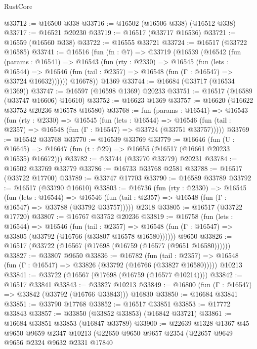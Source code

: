 \begin{lexlean}{RustCore}
\begin{coremodule}
@33712 := @16500 @338
@33716 := @16502 (@16506 @338) (@16512 @338)
@33717 := @16521 @20230
@33719 := @16517 (@33717 @16536)
@33721 := @16559 (@16560 @338)
@33722 := @16555 @33721
@33724 := @16517 (@33722 @16585)
@33741 := @16516
    (fun (fn : @7) =>
    @33719
      (@16539
        (@16542
          (fun (params : @16541) =>
          @16543
            (fun (rty : @2330) =>
            @16545
              (fun (lets : @16544) =>
              @16546 (fun (tail : @2357) => @16548 (fun (Γ : @16547) => @33724 @16632))))))
        @16678))
    @1369
@33744 := @16684 (@33717 (@16534 @1369))
@33747 := @16597 (@16598 @1369) @20233
@33751 := @16517 (@16589 (@33747 @16606) @16610)
@33752 := @16623 @1369
@33757 := @16620 (@16622 @33752 @20236 @16578 @16580)
@33768 := fun (params : @16541) =>
  @16543
    (fun (rty : @2330) =>
    @16545
      (fun (lets : @16544) =>
      @16546 (fun (tail : @2357) => @16548 (fun (Γ : @16547) => @33724 (@33751 @33757)))))
@33769 := @16542 @33768
@33770 := @16539 @33769
@33779 := @16646
    (fun (U : @16645) => @16647 (fun (t : @29) => @16655 (@16517 (@16661 @20233 @16535) @16672)))
@33782 := @33744 (@33770 @33779) @20231
@33784 := @16502 @33769 @33779
@33786 := @16733 @33768 @2581
@33788 := @16517 (@33722 @17700)
@33789 := @33747 @17703
@33790 := @16589 @33789
@33792 := @16517 (@33790 @16610)
@33803 := @16736
    (fun (rty : @2330) =>
    @16545
      (fun (lets : @16544) =>
      @16546 (fun (tail : @2357) => @16548 (fun (Γ : @16547) => @33788 (@33792 @33757)))))
    @2318
@33805 := @16517 (@33722 @17720)
@33807 := @16767 @33752 @20236
@33819 := @16758
    (fun (lets : @16544) =>
    @16546
      (fun (tail : @2357) =>
      @16548 (fun (Γ : @16547) => @33805 (@33792 (@16766 (@33807 @16578 @16580))))))
    @9650
@33826 := @16517 (@33722 (@16567 (@17698 (@16759 (@16577 (@9651 @16580))))))
@33827 := @33807 @9650
@33836 := @16782
    (fun (tail : @2357) => @16548 (fun (Γ : @16547) => @33826 (@33792 (@16766 (@33827 @16580)))))
    @10213
@33841 := @33722 (@16567 (@17698 (@16759 (@16577 @10214))))
@33842 := @16517 @33841
@33843 := @33827 @10213
@33849 := @16800 (fun (Γ : @16547) => @33842 (@33792 (@16766 @33843))) @16830
@33850 := @16684 @33841
@33851 := @33790 @17768
@33852 := @16517 @33851
@33853 := @17772 @33843
@33857 := @33850 (@33852 @33853) (@16842 @33721)
@33861 := @16684 @33851 @33853 (@16847 @33789)
@33900 := @22639
    @1328
    @1367
    @45
    @9650
    @9659
    @2347
    @10213
    (@22650
      @9650
      @9657
      @2354
      (@22657
        @9649
        @9656
        @2324
        @9632
        @2331
        @17840

\end{coremodule}
\end{lexlean}
